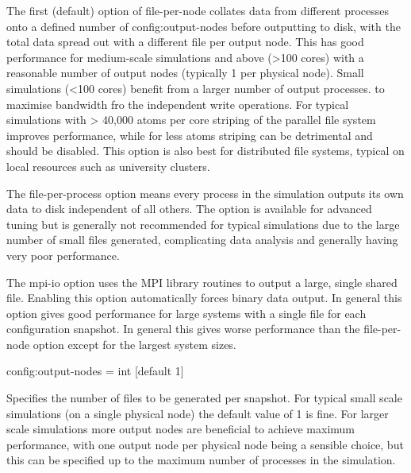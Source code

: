 The first (default) option of file-per-node collates data from different processes onto a defined number of config:output-nodes before
outputting to disk, with the total data spread out with a different file per output node. This has good performance for medium-scale simulations and above (>100 cores) with a reasonable number of output nodes (typically 1 per physical node). Small simulations (<100 cores) benefit from a larger number of output processes. to maximise bandwidth fro the independent write operations. For typical simulations with > 40,000 atoms per core striping of the parallel file system improves performance, while for less atoms striping can be detrimental and should be disabled. This option is also best for distributed file systems, typical on local resources such as university clusters.

The file-per-process option means every process in the simulation outputs its own data to disk independent of all others. The option is available for advanced tuning but is generally not recommended for typical simulations due to the large number of small files generated, complicating data analysis and generally having very poor performance.

The mpi-io option uses the MPI library routines to output a large, single shared file. Enabling this option automatically forces binary data output. In general this option gives good performance for large systems with a single file for each configuration snapshot. In general this gives worse performance than the file-per-node option except for the largest system sizes.

{\zicf config:output-nodes = int [default 1]} Specifies the number of files to be generated per snapshot. For typical small scale simulations (on a single physical node) the default value of 1 is fine. For larger scale simulations more output nodes are beneficial to achieve maximum performance, with one output node per physical node being a sensible choice, but
this can be specified up to the maximum number of processes in the simulation.

